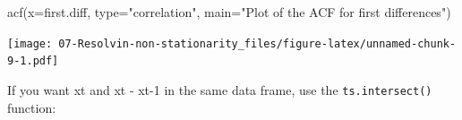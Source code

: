 \documentclass[
]{book}
\newenvironment{Shaded}{\begin{snugshade}}{\end{snugshade}}
\newcommand{\AttributeTok}[1]{\textcolor[rgb]{0.77,0.63,0.00}{#1}}
\newcommand{\DecValTok}[1]{\textcolor[rgb]{0.00,0.00,0.81}{#1}}
\newcommand{\FunctionTok}[1]{\textcolor[rgb]{0.00,0.00,0.00}{#1}}
\newcommand{\NormalTok}[1]{#1}
\newcommand{\OtherTok}[1]{\textcolor[rgb]{0.56,0.35,0.01}{#1}}
\newcommand{\SpecialCharTok}[1]{\textcolor[rgb]{0.00,0.00,0.00}{#1}}
\newcommand{\StringTok}[1]{\textcolor[rgb]{0.31,0.60,0.02}{#1}}
\theoremstyle{definition}
\theoremstyle{definition}
\theoremstyle{definition}
\theoremstyle{definition}
\theoremstyle{remark}
\begin{document}
\begin{Shaded}
\begin{Highlighting}[]
\FunctionTok{acf}\NormalTok{(}\AttributeTok{x=}\NormalTok{first.diff, }\AttributeTok{type=}\StringTok{"correlation"}\NormalTok{, }\AttributeTok{main=}\StringTok{"Plot of the ACF for first differences"}\NormalTok{)}
\end{Highlighting}
\end{Shaded}

\texttt{[image: 07-Resolvin-non-stationarity\_files/figure-latex/unnamed-chunk-9-1.pdf]}

If you want xt and xt - xt-1 in the same data frame, use the \texttt{ts.intersect()} function:

\begin{Shaded}
\end{Shaded}
\end{document}
